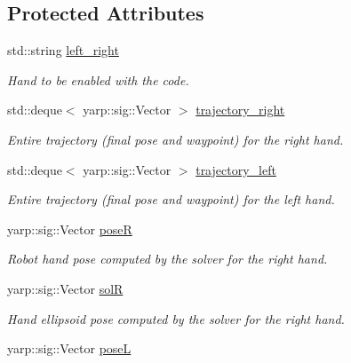 \subsection*{Protected Attributes}
\begin{DoxyCompactItemize}
\item 
std\+::string \hyperlink{classGraspComputation_a7405e0cd57ad3c0ec2757c0d1e6e791a}{left\+\_\+right}\label{classGraspComputation_a7405e0cd57ad3c0ec2757c0d1e6e791a}

\begin{DoxyCompactList}\small\item\em Hand to be enabled with the code. \end{DoxyCompactList}\item 
std\+::deque$<$ yarp\+::sig\+::\+Vector $>$ \hyperlink{classGraspComputation_ad34b98bdd805de7bbbb92204524fb738}{trajectory\+\_\+right}\label{classGraspComputation_ad34b98bdd805de7bbbb92204524fb738}

\begin{DoxyCompactList}\small\item\em Entire trajectory (final pose and waypoint) for the right hand. \end{DoxyCompactList}\item 
std\+::deque$<$ yarp\+::sig\+::\+Vector $>$ \hyperlink{classGraspComputation_a72729f4e74e28f866121da7ec56645ee}{trajectory\+\_\+left}\label{classGraspComputation_a72729f4e74e28f866121da7ec56645ee}

\begin{DoxyCompactList}\small\item\em Entire trajectory (final pose and waypoint) for the left hand. \end{DoxyCompactList}\item 
yarp\+::sig\+::\+Vector \hyperlink{classGraspComputation_accdb354cf67e5ea2c2189f33bfd2e802}{poseR}\label{classGraspComputation_accdb354cf67e5ea2c2189f33bfd2e802}

\begin{DoxyCompactList}\small\item\em Robot hand pose computed by the solver for the right hand. \end{DoxyCompactList}\item 
yarp\+::sig\+::\+Vector \hyperlink{classGraspComputation_aa8c946727c392c140be73ac1c5e83eb2}{solR}\label{classGraspComputation_aa8c946727c392c140be73ac1c5e83eb2}

\begin{DoxyCompactList}\small\item\em Hand ellipsoid pose computed by the solver for the right hand. \end{DoxyCompactList}\item 
yarp\+::sig\+::\+Vector \hyperlink{classGraspComputation_a7a265ee7cb25e2617108e7128ae0cce5}{poseL}\label{classGraspComputation_a7a265ee7cb25e2617108e7128ae0cce5}


\end{DoxyCompactItemize}
